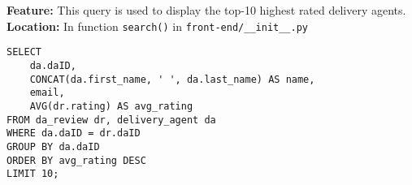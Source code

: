 \textbf{Feature:} This query is used to display the top-10 highest rated delivery agents. \\
\textbf{Location:} In function \texttt{search()} in \texttt{front-end/\_\_init\_\_.py}

\begin{lstlisting}
SELECT
    da.daID,
    CONCAT(da.first_name, ' ', da.last_name) AS name,
    email,
    AVG(dr.rating) AS avg_rating
FROM da_review dr, delivery_agent da
WHERE da.daID = dr.daID
GROUP BY da.daID
ORDER BY avg_rating DESC
LIMIT 10;
\end{lstlisting}
